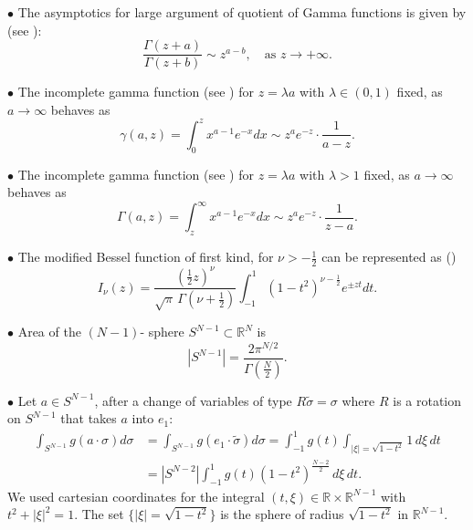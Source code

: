 \documentclass[11pt, twoside, notitlepage]{amsart}
\newcommand\R{\mathbb{R}}
\numberwithin{equation}{section}
\begin{document}
$\bullet$ The asymptotics for large argument of quotient of Gamma functions is given by (see \cite[Ch.~5, formula (5.11.12)]{OlMax}):
\begin{equation}\label{asymp:GammaQuotient}
\frac{\Gamma(z+a)}{\Gamma(z+b)} \sim z^{a-b},\quad \text{as } z \to +\infty.
\end{equation}



$\bullet$ The incomplete gamma function (see \cite[formula (8.11.6)]{OlMax}) for $z=\lambda a$ with $\lambda \in (0,1)$ fixed, as $a\to \infty$ behaves as
\begin{equation}\label{Incomplete:gamma}
  \gamma(a,z)= \int_{0}^{z} x^{a-1}e^{-x} dx  \sim   z^a e^{-z} \cdot \frac{1}{a-z}.
\end{equation}


$\bullet$ The incomplete gamma function (see \cite[formula (8.11.7)]{OlMax}) for $z=\lambda a$ with $\lambda > 1 $ fixed, as $a\to \infty$ behaves as
\begin{equation}\label{Incomplete:Gamma}\Gamma(a,z)= \int_{z}^\infty x^{a-1}e^{-x} dx  \sim   z^a e^{-z} \cdot \frac{1}{z-a}.
\end{equation}






$\bullet$ The modified Bessel function of first kind, for $\nu>-\frac{1}{2}$ can be represented as (\cite[formula (10.32.2)]{OlMax})
\begin{equation}\label{BesselI}
  I_\nu (z)= \frac{(\frac{1}{2}z) ^\nu}{ \sqrt{\pi} \, \Gamma(\nu + \frac{1}{2})} \int_{-1}^{1} (1-t^2)^{\nu - \frac{1}{2}} e^{\pm zt} dt.
\end{equation}

$\bullet$ Area of the $(N-1)$- sphere  $S^{N-1} \subset \mathbb{R}^N$ is
\begin{equation}\label{area:sphere}
  |S^{N-1}|= \frac{2 \pi^{N/2}}{\Gamma\left(\frac{N}{2}\right)}.
\end{equation}

$\bullet$ Let $a\in S^{N-1}$, after a change of variables of type $R \tilde{\sigma}=\sigma$ where $R$ is a rotation on $S^{N-1}$ that takes $a$ into $e_1$:
\begin{align}\label{Integral:Rotation}
\int_{S^{N-1}} g (a\cdot\sigma) d\sigma &= \int_{S^{N-1}} g ( e_1\cdot \tilde{\sigma} ) d\sigma  =   \int_{-1}^1 g (t) \int_{|\xi|=\sqrt{1-t^2}} 1 \, d\xi  \,dt\\  \nonumber
&=
| S^{N-2} | \int_{-1}^1 g (t)(1-t^2)^{  \frac{N-2}{2} }\, d\xi  \,dt .
\end{align}
We used cartesian coordinates for the integral $ (t,\xi) \in \R \times \R^{N-1}$ with $ t^2 + |\xi|^2 =1$. The set $\{ |\xi|=\sqrt{1-t^2} \} $ is the sphere of radius $\sqrt{1-t^2}$ in $\R^{N-1}$.
\end{document}
